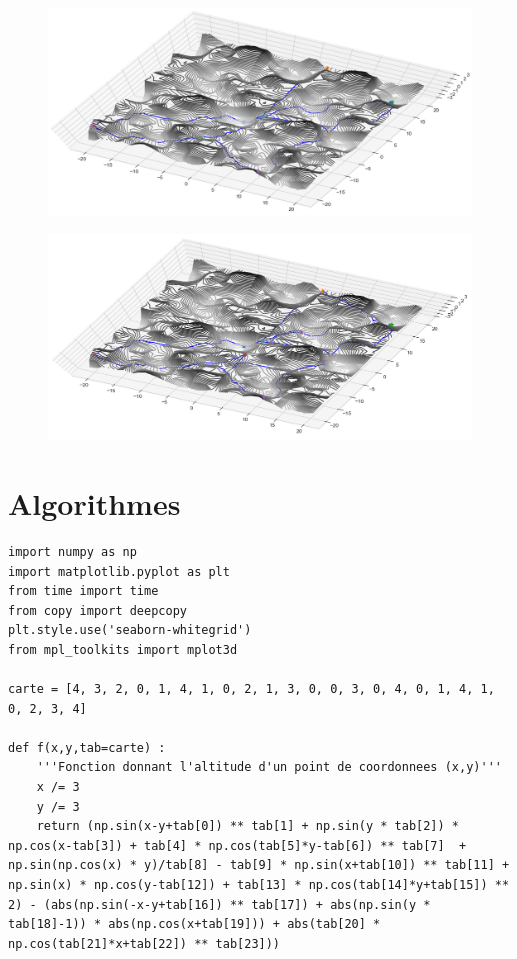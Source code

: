 \documentclass{beamer}[11pt]
\begin{document}
		\begin{frame}
			\begin{figure}[t]
				\includegraphics[width=1\textwidth]{Pics/g32.png}
			\end{figure}
		\end{frame}

		\begin{frame}
			\begin{figure}[t]
				\includegraphics[width=1\textwidth]{Pics/g33.png}
			\end{figure}
		\end{frame}

	\section{Algorithmes}

		\begin{frame}[containsverbatim]
\begin{lstlisting}
import numpy as np
import matplotlib.pyplot as plt
from time import time
from copy import deepcopy
plt.style.use('seaborn-whitegrid')
from mpl_toolkits import mplot3d

carte = [4, 3, 2, 0, 1, 4, 1, 0, 2, 1, 3, 0, 0, 3, 0, 4, 0, 1, 4, 1, 0, 2, 3, 4]

def f(x,y,tab=carte) :
    '''Fonction donnant l'altitude d'un point de coordonnees (x,y)'''
    x /= 3
    y /= 3
    return (np.sin(x-y+tab[0]) ** tab[1] + np.sin(y * tab[2]) * np.cos(x-tab[3]) + tab[4] * np.cos(tab[5]*y-tab[6]) ** tab[7]  + np.sin(np.cos(x) * y)/tab[8] - tab[9] * np.sin(x+tab[10]) ** tab[11] + np.sin(x) * np.cos(y-tab[12]) + tab[13] * np.cos(tab[14]*y+tab[15]) ** 2) - (abs(np.sin(-x-y+tab[16]) ** tab[17]) + abs(np.sin(y * tab[18]-1)) * abs(np.cos(x+tab[19])) + abs(tab[20] * np.cos(tab[21]*x+tab[22]) ** tab[23]))
\end{lstlisting}
		\end{frame}
\end{document}
